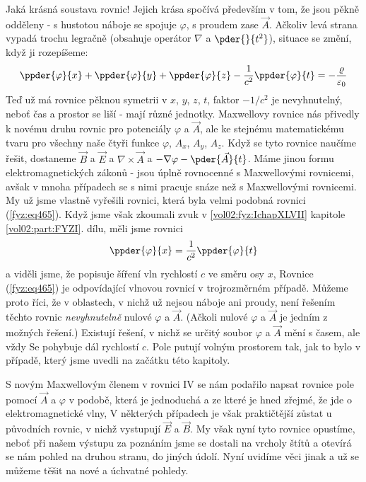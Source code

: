  Jaká krásná soustava rovnic! Jejich krása spočívá především v tom, že jsou pěkně odděleny - s 
  hustotou náboje se spojuje \(\varphi\), s proudem zase \(\vec{A}\). Ačkoliv levá strana vypadá 
  trochu legračně (obsahuje operátor \(\nabla\) a \(\pder{}{t^2}\)), situace se změní, když ji 
  rozepíšeme:
  \begin{equation}\label{fyz:eq465}
    \ppder{\varphi}{x} + \ppder{\varphi}{y} + \ppder{\varphi}{z} - \frac{1}{c^2}\ppder{\varphi}{t}
      = - \frac{\varrho}{\varepsilon_0}
  \end{equation} 
  Teď už má rovnice pěknou symetrii v \(x\), \(y\), \(z\), \(t\), faktor \(-1/c^2\) je 
  nevyhnutelný, neboť čas a prostor se liší - mají různé jednotky. Maxwellovy rovnice nás přivedly 
  k novému druhu rovnic pro potenciály \(\varphi\) a \(\vec{A}\), ale ke stejnému matematickému 
  tvaru pro všechny naše čtyři funkce \(\varphi\), \(A_x\), \(A_y\), \(A_z\). Když se tyto rovnice 
  naučíme řešit, dostaneme \(\vec{B}\) a \(\vec{E}\) a \(\nabla\times\vec{A}\) a \(-\nabla\varphi - 
  \pder{\vec{A}}{t}\). Máme jinou formu elektromagnetických zákonů - jsou úplně rovnocenné s 
  Maxwellovými rovnicemi, avšak v mnoha případech se s nimi pracuje snáze než s Maxwellovými 
  rovnicemi. My už jsme vlastně vyřešili rovnici, která byla velmi podobná rovnici 
  (\ref{fyz:eq465}). Když jsme však zkoumali zvuk v \ref{vol02:fyz:IchapXLVII} kapitole \ref{vol02:part:FYZI}. 
  dílu, měli jsme rovnici
  \begin{equation*}
    \ppder{\varphi}{x} = \frac{1}{c^2}\ppder{\varphi}{t}
  \end{equation*} 
  a viděli jsme, že popisuje šíření vln rychlostí \(c\) ve směru osy \(x\), Rovnice 
  (\ref{fyz:eq465}) je odpovídající vlnovou rovnicí v trojrozměrném případě. Můžeme proto říci, že 
  v oblastech, v nichž už nejsou náboje ani proudy, není řešením těchto rovnic \emph{nevyhnutelně} 
  nulové \(\varphi\) a \(\vec{A}\). (Ačkoli nulové \(\varphi\) a \(\vec{A}\) je jedním z možných 
  řešení.) Existují řešení, v nichž se určitý soubor \(\varphi\) a \(\vec{A}\) mění s časem, ale 
  vždy Se pohybuje dál rychlostí \(c\). Pole putují volným prostorem tak, jak to bylo v případě, 
  který jsme uvedli na začátku této kapitoly.
  
  S novým Maxwellovým členem v rovnici IV se nám podařilo napsat rovnice pole pomocí \(\vec{A}\) a 
  \(\varphi\) v podobě, která je jednoduchá a ze které je hned zřejmé, že jde o elektromagnetické 
  vlny, V některých případech je však praktičtější zůstat u původních rovnic, v nichž vystupují 
  \(\vec{E}\) a \(\vec{B}\). My však nyní tyto rovnice opustíme, neboť při našem výstupu za 
  poznáním jsme se dostali na vrcholy štítů a otevírá se nám pohled na druhou stranu, do jiných 
  údolí. Nyní uvidíme věci jinak a už se můžeme těšit na nové a úchvatné pohledy.

  
